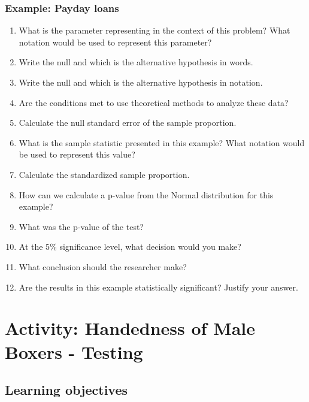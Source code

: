 \documentclass[
]{report}
\newcommand{\rgs}{\vspace{12pt}} %
\begin{document}
\hypertarget{example-payday-loans}{%
\subsubsection*{Example: Payday loans}\label{example-payday-loans}}

\begin{enumerate}
\def\labelenumi{\arabic{enumi}.}
\item
  What is the parameter representing in the context of this problem? What notation would be used to represent this parameter?
  \rgs
\item
  Write the null and which is the alternative hypothesis in words.
  \rgs
\item
  Write the null and which is the alternative hypothesis in notation.
  \rgs
\item
  Are the conditions met to use theoretical methods to analyze these data?
  \rgs
\item
  Calculate the null standard error of the sample proportion.
  \rgs
\item
  What is the sample statistic presented in this example? What notation would be used to represent this value?
  \rgs
\item
  Calculate the standardized sample proportion.
  \rgs
\item
  How can we calculate a p-value from the Normal distribution for this example?
  \rgs
\item
  What was the p-value of the test?
  \rgs
\item
  At the 5\% significance level, what decision would you make?
  \rgs
\item
  What conclusion should the researcher make?
  \rgs
\item
  Are the results in this example statistically significant? Justify your answer.
  \rgs
\end{enumerate}

\newpage

\hypertarget{activity-handedness-of-male-boxers---testing}{%
\section{Activity: Handedness of Male Boxers - Testing}\label{activity-handedness-of-male-boxers---testing}}


\hypertarget{learning-objectives-2}{%
\subsection{Learning objectives}\label{learning-objectives-2}}
\end{document}
